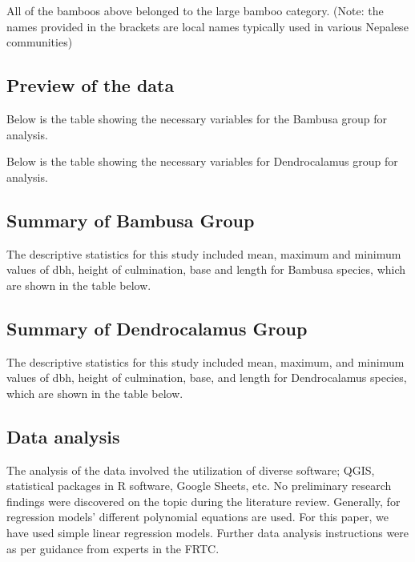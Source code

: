 \documentclass[preprint, 3p,
authoryear]{elsarticle} %
\begin{document}
All of the bamboos above belonged to the large bamboo category. (Note:
the names provided in the brackets are local names typically used in
various Nepalese communities)

\hypertarget{preview-of-the-data}{%
\subsection{Preview of the data}\label{preview-of-the-data}}

Below is the table showing the necessary variables for the Bambusa group
for analysis.

Below is the table showing the necessary variables for Dendrocalamus
group for analysis.

\hypertarget{summary-of-bambusa-group}{%
\subsection{Summary of Bambusa Group}\label{summary-of-bambusa-group}}

The descriptive statistics for this study included mean, maximum and
minimum values of dbh, height of culmination, base and length for
Bambusa species, which are shown in the table below.

\hypertarget{summary-of-dendrocalamus-group}{%
\subsection{Summary of Dendrocalamus
Group}\label{summary-of-dendrocalamus-group}}

The descriptive statistics for this study included mean, maximum, and
minimum values of dbh, height of culmination, base, and length for
Dendrocalamus species, which are shown in the table below.

\hypertarget{data-analysis}{%
\subsection{Data analysis}\label{data-analysis}}

The analysis of the data involved the utilization of diverse software;
QGIS, statistical packages in R software, Google Sheets, etc. No
preliminary research findings were discovered on the topic during the
literature review. Generally, for regression models' different
polynomial equations are used. For this paper, we have used simple
linear regression models. Further data analysis instructions were as per
guidance from experts in the FRTC.
\end{document}
